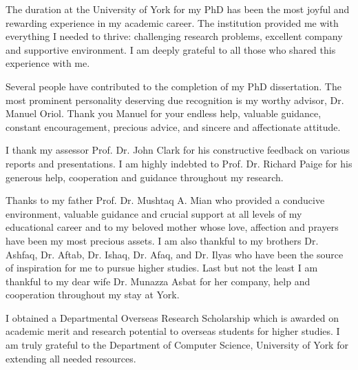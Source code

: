 \begin{acknowledgements}
The duration at the University of York for my PhD has been the most joyful and rewarding experience in my academic career. The institution provided me with everything I needed to thrive: challenging research problems, excellent company and supportive environment. I am deeply grateful to all those who shared this experience with me. 

Several people have contributed to the completion of my PhD dissertation. The most prominent personality deserving due recognition is my worthy advisor, Dr. Manuel Oriol. Thank you Manuel for your endless help, valuable guidance, constant encouragement, precious advice, and sincere and affectionate attitude.

I thank my assessor Prof. Dr. John Clark for his constructive feedback on various reports and presentations. I am highly indebted to Prof. Dr. Richard Paige for his generous help, cooperation and guidance throughout my research.

Thanks to my father Prof. Dr. Mushtaq A. Mian who provided a conducive environment, valuable guidance and crucial support at all levels of my educational career and to my beloved mother whose love, affection and prayers have been my most precious assets. I am also thankful to my brothers Dr. Ashfaq, Dr. Aftab, Dr. Ishaq, Dr. Afaq, and Dr. Ilyas who have been the source of inspiration for me to pursue higher studies. Last but not the least I am thankful to my dear wife Dr. Munazza Asbat for her company, help and cooperation throughout my stay at York.

I obtained a Departmental Overseas Research Scholarship which is awarded on academic merit and research potential to overseas students for higher studies. I am truly grateful to the Department of Computer Science, University of York for extending all needed resources.
\end{acknowledgements}